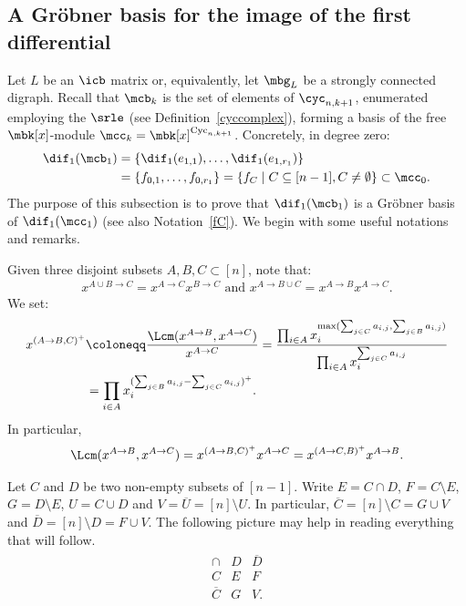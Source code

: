 \subsection{A Gr\"obner basis for the image of the first differential}

 Let $L$ be an $\icb$ matrix or, equivalently, let $\mbg_L$
be a strongly connected digraph.  Recall that $\mcb_k$ is the set of
elements of $\cyc_{n,k+1}$, enumerated employing the $\srle$ (see
Definition~\ref{cyccomplex}), forming a basis of the free
$\mbk[x]$-module $\mcc_k=\mbk[x]^{{\rm Cyc}_{n,k+1}}$. Concretely, in
degree zero: 
\begin{align*}
 \dif_1(\mcb_1)&=\{\dif_{1}(e_{1,1}),\ldots ,\dif_{1}(e_{1,r_1})\}\\
&=\{f_{0,1},\ldots,f_{0,r_1}\}=\{f_C\mid C\subseteq [n-1],
C\neq\emptyset\}\subset \mcc_0.
\end{align*}
The purpose of this subsection is to prove that $\dif_1(\mcb_1)$ is a
Gr\"obner basis of $\dif_1(\mcc_1)$ (see also Notation~\ref{fC}). We
begin with some useful notations and remarks.

\begin{notation}\label{lcm-notation}
Given three disjoint subsets $A,B,C\subset [n]$, note that:
\begin{eqnarray}\label{disjoint}
x^{A\cup B\to C}=x^{A\to C}x^{B\to C}\mbox{ and }x^{A\to B\cup
  C}=x^{A\to B}x^{A\to C}.
\end{eqnarray}
We set:
\begin{align}
x^{(A\to B,C)^+} & \coloneqq
\frac{\Lcm(x^{A\to B},x^{A\to C})}{x^{A\to C}}= 
\frac{\prod_{i\in A}x_i^{\max(\sum_{j\in C}a_{i,j},\sum_{j\in B}a_{i,j})}}
{\prod_{i\in A}x_i^{\sum_{j\in C}a_{i,j}}} \\
&=\prod_{i\in A}x_i^{(\sum_{j\in B}a_{i,j}-\sum_{j\in C}a_{i,j})^{+}}. \notag
\end{align}
In particular,
\begin{eqnarray}\label{lcm-equality}
\Lcm(x^{A\to B},x^{A\to C})=x^{(A\to B,C)^+}x^{A\to C}=x^{(A\to C,B)^+}x^{A\to B}.
\end{eqnarray}
\end{notation}

\begin{notation}\label{FG-notation}
Let $C$ and $D$ be two non-empty subsets of $[n-1]$. Write $E=C\cap
D$, $F=C\setminus E$, $G=D\setminus E$, $U=C\cup D$ and
$V=\overline{U}=[n]\setminus U$. In particular,
$\overline{C}=[n]\setminus C=G\cup V$ and $\overline{D}=[n]\setminus
D=F\cup V$.  The following picture may help in reading everything that
will follow.
\begin{eqnarray*}
\begin{array}{c|c|c}
\cap &D&\overline{D}\\\hline
C&E&F\\\hline
\overline{C}&G&V.
\end{array}
\end{eqnarray*}
\end{notation}

